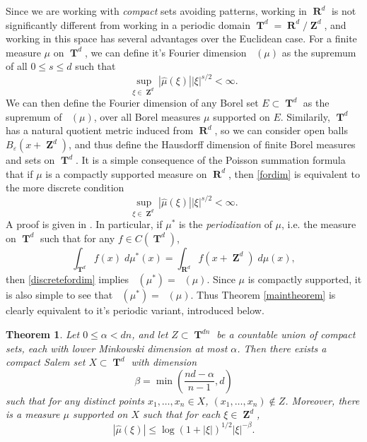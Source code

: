 \documentclass[12pt,reqno]{article}
\DeclareMathOperator{\hausdim}{\dim_{\mathbf{H}}}
\DeclareMathOperator{\fordim}{\dim_{\mathbf{F}}}
\DeclareMathOperator{\RR}{\mathbf{R}}
\DeclareMathOperator{\ZZ}{\mathbf{Z}}
\DeclareMathOperator{\TT}{\mathbf{T}}
\newtheorem{theorem}{Theorem}
\begin{document}
Since we are working with \emph{compact} sets avoiding patterns, working in $\RR^d$ is not significantly different from working in a periodic domain $\TT^d = \RR^d / \ZZ^d$, and working in this space has several advantages over the Euclidean case. For a finite measure $\mu$ on $\TT^d$, we can define it's Fourier dimension $\fordim(\mu)$ as the supremum of all $0 \leq s \leq d$ such that
%
\begin{equation} \label{fordimtorus}
    \sup_{\xi \in \ZZ^d} |\widehat{\mu}(\xi)| |\xi|^{s/2} < \infty.
\end{equation}
%
We can then define the Fourier dimension of any Borel set $E \subset \TT^d$ as the supremum of $\fordim(\mu)$, over all Borel measures $\mu$ supported on $E$. Similarily, $\TT^d$ has a natural quotient metric induced from $\RR^d$, so we can consider open balls $B_\varepsilon(x + \ZZ^d)$, and thus define the Hausdorff dimension of finite Borel measures and sets on $\TT^d$. It is a simple consequence of the Poisson summation formula that if $\mu$ is a compactly supported measure on $\RR^d$, then \eqref{fordim} is equivalent to the more discrete condition
%
\begin{equation} \label{discretefordim}
    \sup_{\xi \in \ZZ^d} |\widehat{\mu}(\xi)| |\xi|^{s/2} < \infty.
\end{equation}
%
A proof is given in \cite[Lemma 39]{myThesis}. In particular, if $\mu^*$ is the \emph{periodization} of $\mu$, i.e. the measure on $\TT^d$ such that for any $f \in C(\TT^d)$,
%
\[ \int_{\TT^d} f(x)\; d\mu^*(x) = \int_{\RR^d} f(x + \ZZ^d)\; d\mu(x), \]
%
then \eqref{discretefordim} implies $\fordim(\mu^*) = \fordim(\mu)$. Since $\mu$ is compactly supported, it is also simple to see that $\hausdim(\mu^*) = \hausdim(\mu)$. Thus Theorem \ref{maintheorem} is clearly equivalent to it's periodic variant, introduced below.

\begin{theorem} \label{periodictheorem}
    Let $0 \leq \alpha < dn$, and let $Z \subset \TT^{dn}$ be a countable union of compact sets, each with lower Minkowski dimension at most $\alpha$. Then there exists a compact Salem set $X \subset \TT^d$ with dimension
    \[ \beta = \min \left( \frac{nd - \alpha}{n-1}, d \right) \]
    such that for any distinct points $x_1, \dots, x_n \in X$, $(x_1, \dots, x_n) \not \in Z$. Moreover, there is a measure $\mu$ supported on $X$ such that for each $\xi \in \ZZ^d$,
    \[ |\widehat{\mu}(\xi)| \leq \log(1 + |\xi|)^{1/2} |\xi|^{-\beta}. \]
\end{theorem}
\end{document}
